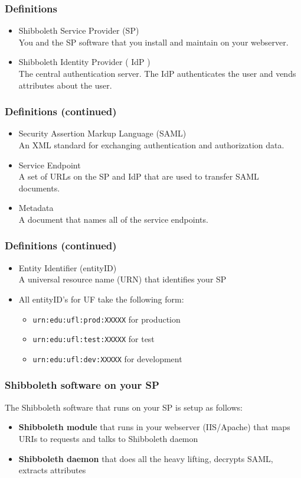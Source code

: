 \documentclass[hyperref={colorlinks=true},professionalfonts]{beamer}
\begin{document}
\begin{frame}
\frametitle{Definitions}
\begin{itemize} 
\item Shibboleth Service Provider (SP) \\ You and the SP software that you install and maintain on your webserver.
\item Shibboleth Identity Provider ( IdP ) \\ The central authentication server. The IdP authenticates the user and vends attributes about the user.
\end{itemize}
\end{frame}

\begin{frame}
\frametitle{Definitions (continued)}
\begin{itemize}
\item Security Assertion Markup Language (SAML) \\ An XML standard for exchanging authentication and authorization data.
\item Service Endpoint \\ A set of URLs on the SP and IdP that are used to transfer SAML documents.
\item Metadata \\ A document that names all of the service endpoints.
\end{itemize}
\end{frame}

\begin{frame}
\frametitle{Definitions (continued)}
\begin{itemize}
\item Entity Identifier (entityID) \\ A universal resource name (URN) that identifies your SP
\item All entityID's for UF take the following form: \begin{itemize}
\item \texttt{urn:edu:ufl:prod:XXXXX} for production
\item \texttt{urn:edu:ufl:test:XXXXX} for test
\item \texttt{urn:edu:ufl:dev:XXXXX} for development
\end{itemize}
\end{itemize}
\end{frame}

\begin{frame}
\frametitle{Shibboleth software on your SP}
The Shibboleth software that runs on your SP is setup as follows:
\begin{itemize}
\item \textbf{Shibboleth module} that runs in your webserver (IIS/Apache) that maps URIs to requests and talks to Shibboleth daemon
\item \textbf{Shibboleth daemon} that does all the heavy lifting, decrypts SAML, extracts attributes
\end{itemize}
\end{frame}
\end{document}
